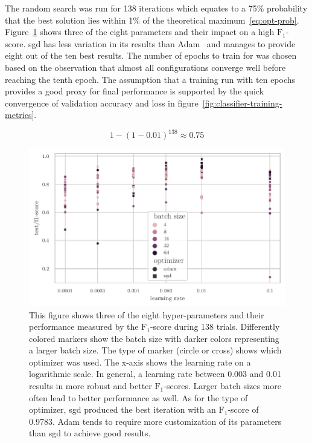 \documentclass[draft,final]{vutinfth} %
\begin{document}
The random search was run for 138 iterations which equates to a 75\%
probability that the best solution lies within 1\% of the theoretical
maximum~\eqref{eq:opt-prob}. Figure~\ref{fig:classifier-hyp-results}
shows three of the eight parameters and their impact on a high
$\mathrm{F}_1$-score. \gls{sgd} has less variation in its results than
Adam~\cite{kingma2017} and manages to provide eight out of the ten
best results. The number of epochs to train for was chosen based on
the observation that almost all configurations converge well before
reaching the tenth epoch. The assumption that a training run with ten
epochs provides a good proxy for final performance is supported by the
quick convergence of validation accuracy and loss in
figure~\ref{fig:classifier-training-metrics}.

\begin{equation}\label{eq:opt-prob}
  1 - (1 - 0.01)^{138} \approx 0.75
\end{equation}

\begin{figure}
  \centering
  \includegraphics{graphics/classifier-hyp-metrics.pdf}
  \caption[Classifier hyper-parameter optimization results.]{This
    figure shows three of the eight hyper-parameters and their
    performance measured by the $\mathrm{F}_1$-score during 138
    trials. Differently colored markers show the batch size with
    darker colors representing a larger batch size. The type of marker
    (circle or cross) shows which optimizer was used. The x-axis shows
    the learning rate on a logarithmic scale. In general, a learning
    rate between 0.003 and 0.01 results in more robust and better
    $\mathrm{F}_1$-scores. Larger batch sizes more often lead to
    better performance as well. As for the type of optimizer,
    \gls{sgd} produced the best iteration with an $\mathrm{F}_1$-score
    of 0.9783. Adam tends to require more customization of its
    parameters than \gls{sgd} to achieve good results.}
  \label{fig:classifier-hyp-results}
\end{figure}
\end{document}

